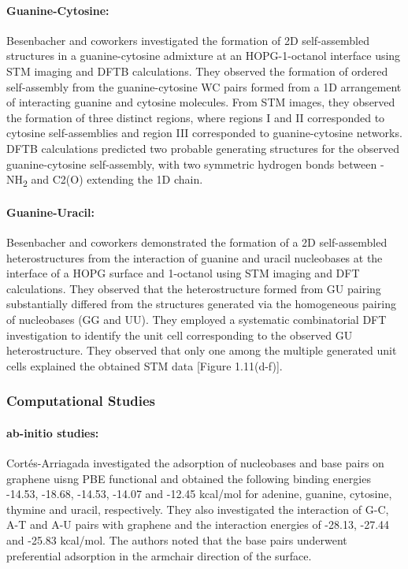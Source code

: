 \paragraph{Guanine-Cytosine:} Besenbacher and coworkers investigated the formation of 2D self-assembled structures in a guanine-cytosine admixture at an HOPG-1-octanol interface using STM imaging and DFTB calculations.\supercite{xu_coadsorption_2006} They observed the formation of ordered self-assembly from the guanine-cytosine WC pairs formed from a 1D arrangement of interacting guanine and cytosine molecules. From STM images, they observed the formation of three distinct regions, where regions I and II corresponded to cytosine self-assemblies and region III corresponded to guanine-cytosine networks. DFTB calculations predicted two probable generating structures for the observed guanine-cytosine self-assembly, with two symmetric hydrogen bonds between -NH\textsubscript{2} and C2(O) extending the 1D chain. 

\paragraph{Guanine-Uracil:} Besenbacher and coworkers demonstrated the formation of a 2D self-assembled heterostructures from the interaction of guanine and uracil nucleobases at the interface of a HOPG surface and 1-octanol using STM imaging and DFT calculations.\supercite{mamdouh_two-dimensional_2008} They observed that the heterostructure formed from GU pairing substantially differed from the structures generated via the homogeneous pairing of nucleobases (GG and UU). They employed a systematic combinatorial DFT investigation to identify the unit cell corresponding to the observed GU heterostructure. They observed that only one among the multiple generated unit cells explained the obtained STM data [Figure 1.11(d-f)].

\subsubsection{Computational Studies}
\paragraph{ab-initio studies:} Cort\'{e}s-Arriagada investigated the adsorption of nucleobases and base pairs on graphene uisng PBE functional and obtained the following binding energies -14.53,  -18.68, -14.53, -14.07 and -12.45 kcal/mol for adenine, guanine, cytosine, thymine and uracil, respectively.\supercite{cortes-arriagada_phosphorene_2018} They also investigated the interaction of G-C, A-T and A-U pairs with graphene and the interaction energies of -28.13, -27.44 and -25.83 kcal/mol. The authors noted that the base pairs underwent preferential adsorption in the armchair direction of the surface.

